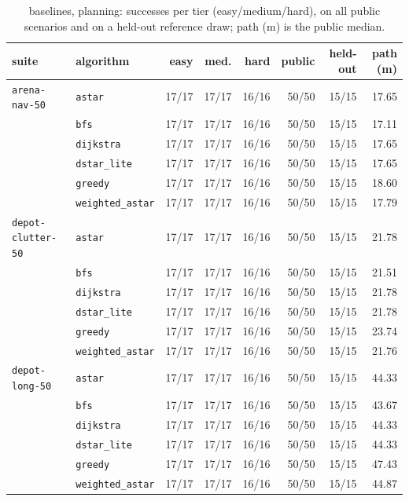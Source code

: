 \begin{table}[t]
\centering
\scriptsize
\caption{ baselines, planning: successes per tier (easy/medium/hard), on all public scenarios and on a held-out reference draw; path (m) is the public median.}
\label{tab:base-planning}
\setlength{\tabcolsep}{2.5pt}
\begin{tabular}{llrrrrrr}
\toprule
suite & algorithm & easy & med. & hard & public & held-out & path (m) \\
\midrule
\texttt{arena-nav-50} & \texttt{astar} & 17/17 & 17/17 & 16/16 & 50/50 & 15/15 & 17.65 \\
 & \texttt{bfs} & 17/17 & 17/17 & 16/16 & 50/50 & 15/15 & 17.11 \\
 & \texttt{dijkstra} & 17/17 & 17/17 & 16/16 & 50/50 & 15/15 & 17.65 \\
 & \texttt{dstar\_lite} & 17/17 & 17/17 & 16/16 & 50/50 & 15/15 & 17.65 \\
 & \texttt{greedy} & 17/17 & 17/17 & 16/16 & 50/50 & 15/15 & 18.60 \\
 & \texttt{weighted\_astar} & 17/17 & 17/17 & 16/16 & 50/50 & 15/15 & 17.79 \\
\midrule
\texttt{depot-clutter-50} & \texttt{astar} & 17/17 & 17/17 & 16/16 & 50/50 & 15/15 & 21.78 \\
 & \texttt{bfs} & 17/17 & 17/17 & 16/16 & 50/50 & 15/15 & 21.51 \\
 & \texttt{dijkstra} & 17/17 & 17/17 & 16/16 & 50/50 & 15/15 & 21.78 \\
 & \texttt{dstar\_lite} & 17/17 & 17/17 & 16/16 & 50/50 & 15/15 & 21.78 \\
 & \texttt{greedy} & 17/17 & 17/17 & 16/16 & 50/50 & 15/15 & 23.74 \\
 & \texttt{weighted\_astar} & 17/17 & 17/17 & 16/16 & 50/50 & 15/15 & 21.76 \\
\midrule
\texttt{depot-long-50} & \texttt{astar} & 17/17 & 17/17 & 16/16 & 50/50 & 15/15 & 44.33 \\
 & \texttt{bfs} & 17/17 & 17/17 & 16/16 & 50/50 & 15/15 & 43.67 \\
 & \texttt{dijkstra} & 17/17 & 17/17 & 16/16 & 50/50 & 15/15 & 44.33 \\
 & \texttt{dstar\_lite} & 17/17 & 17/17 & 16/16 & 50/50 & 15/15 & 44.33 \\
 & \texttt{greedy} & 17/17 & 17/17 & 16/16 & 50/50 & 15/15 & 47.43 \\
 & \texttt{weighted\_astar} & 17/17 & 17/17 & 16/16 & 50/50 & 15/15 & 44.87 \\

\end{tabular}
\end{table}
